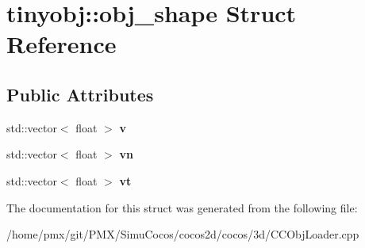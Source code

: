 \hypertarget{structtinyobj_1_1obj__shape}{}\section{tinyobj\+:\+:obj\+\_\+shape Struct Reference}
\label{structtinyobj_1_1obj__shape}
\subsection*{Public Attributes}
\begin{DoxyCompactItemize}
\item 
\mbox{\label{structtinyobj_1_1obj__shape_a3404ac55760b378a5c5989bf59f0c5fa}} 
std\+::vector$<$ float $>$ {\bfseries v}
\item 
\mbox{\label{structtinyobj_1_1obj__shape_af65880ff8d2efdbf8ff1f89cda926e03}} 
std\+::vector$<$ float $>$ {\bfseries vn}
\item 
\mbox{\label{structtinyobj_1_1obj__shape_af8d7b39eae6d541dacae5928fc33351e}} 
std\+::vector$<$ float $>$ {\bfseries vt}
\end{DoxyCompactItemize}


The documentation for this struct was generated from the following file\+:\begin{DoxyCompactItemize}
\item 
/home/pmx/git/\+P\+M\+X/\+Simu\+Cocos/cocos2d/cocos/3d/C\+C\+Obj\+Loader.\+cpp\end{DoxyCompactItemize}
